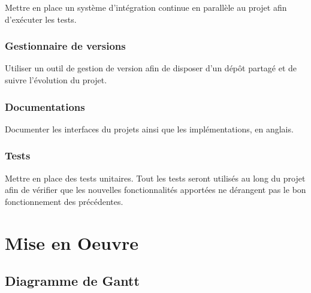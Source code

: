 \documentclass[12pt]{report}
\begin{document}
Mettre en place un système d'intégration continue en parallèle au projet
afin d'exécuter les tests.\\

\subsection{Gestionnaire de versions}

Utiliser un outil de gestion de version afin de disposer d'un dépôt
partagé et de suivre l'évolution du projet.\\

\subsection{Documentations}

Documenter les interfaces du projets ainsi que les implémentations, en
anglais.\\

\subsection{Tests}

Mettre en place des tests unitaires. Tout les tests seront utilisés au
long du projet afin de vérifier que les nouvelles fonctionnalités
apportées ne dérangent pas le bon fonctionnement des précédentes.

\newpage

\chapter*{Mise en Oeuvre}
\setcounter{chapter}{4}




\section{Diagramme de Gantt}



{}

\end{document}
